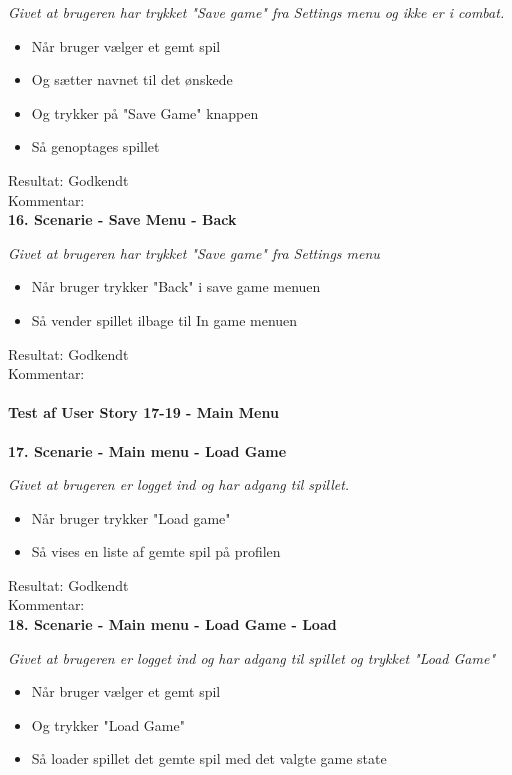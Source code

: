 \textit{Givet at brugeren har trykket "Save game" fra Settings menu og ikke er i combat.}

\begin{itemize}
  \item Når bruger vælger et gemt spil
  \item Og sætter navnet til det ønskede
  \item Og trykker på "Save Game" knappen
  \item Så genoptages spillet
\end{itemize}

Resultat: Godkendt\\
Kommentar:\\

\textbf{16. Scenarie - Save Menu - Back}

\textit{Givet at brugeren har trykket "Save game" fra Settings menu}

\begin{itemize}
  \item Når bruger trykker "Back" i save game menuen
  \item Så vender spillet ilbage til In game menuen
\end{itemize}

Resultat: Godkendt\\
Kommentar:\\

\paragraph{Test af User Story 17-19 - Main Menu}

\textbf{17. Scenarie - Main menu - Load Game}

\textit{Givet at brugeren er logget ind og har adgang til spillet.}

\begin{itemize}
  \item Når bruger trykker "Load game"
  \item Så vises en liste af gemte spil på profilen
\end{itemize}

Resultat: Godkendt\\
Kommentar:\\

\textbf{18. Scenarie - Main menu - Load Game - Load}

\textit{Givet at brugeren er logget ind og har adgang til spillet og trykket "Load Game"}

\begin{itemize}
  \item Når bruger vælger et gemt spil
  \item Og trykker "Load Game"
  \item Så loader spillet det gemte spil med det valgte game state
\end{itemize}

